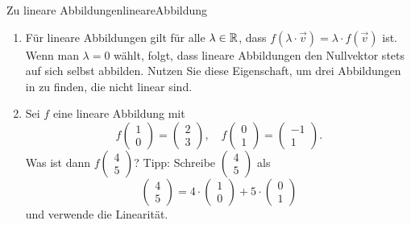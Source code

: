 \begin{ueb}{Zu lineare Abbildungen}{lineareAbbildung}
\begin{enumerate}
        \item Für lineare Abbildungen gilt für alle $\lambda \in \mathbb{R}$, dass \( f(\lambda \cdot \vec{v}) = \lambda \cdot f(\vec{v}) \) ist. Wenn man \( \lambda = 0 \) wählt, folgt, dass lineare Abbildungen den Nullvektor stets auf sich selbst abbilden. Nutzen Sie diese Eigenschaft, um drei Abbildungen in  zu finden, die nicht linear sind.
    
        \item Sei \( f \) eine lineare Abbildung mit 
        \[
        f \begin{pmatrix} 1 \\ 0 \end{pmatrix} = \begin{pmatrix} 2 \\ 3 \end{pmatrix}, 
        \quad f \begin{pmatrix} 0 \\ 1 \end{pmatrix} = \begin{pmatrix} -1 \\ 1 \end{pmatrix}.
        \]
        Was ist dann \( f \begin{pmatrix} 4 \\ 5 \end{pmatrix} \)?  
        Tipp: Schreibe \( \begin{pmatrix} 4 \\ 5 \end{pmatrix} \) als  
        \[
        \begin{pmatrix} 4 \\ 5 \end{pmatrix} = 4 \cdot \begin{pmatrix} 1 \\ 0 \end{pmatrix} + 5 \cdot \begin{pmatrix} 0 \\ 1 \end{pmatrix}
        \]
        und verwende die Linearität.
    

\end{enumerate}
\end{ueb}
